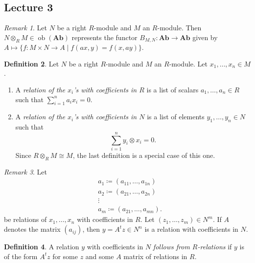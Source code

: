\documentclass[10pt,letterpaper,cm]{nupset}
\theoremstyle{definition}
\newtheorem{definition}{Definition}[subsection]
\theoremstyle{theorem}
\theoremstyle{remark}
\newtheorem{remark}[definition]{Remark}
\newcommand{\1}{\mathbf{1}}
\newcommand{\0}{\vec 0}
\DeclareMathOperator{\ob}{ob}
\begin{document}
\subsection{Lecture 3}

\begin{remark}
Let $N$ be a right $R$-module and $M$ an $R$-module. Then $N \otimes_R M \in \ob(\mathbf{Ab})$ represents the functor $B_{M, N}: \mathbf{Ab} \to \mathbf{Ab}$ given by $A \mapsto \{f:  M \times N \to A \mid f(ax, y) = f(x, ay) \}$. 
\end{remark}

\begin{definition} Let $N$ be a right $R$-module and $M$ an $R$-module. Let $x_1, \ldots, x_n \in M$.
\begin{enumerate}
\item A \textit{relation of the $x_i$'s with coefficients in $R$} is a list of scalars $a_1, \ldots, a_n \in R$ such that $\sum_{i=1}^n a_ix_i =0$.
\item A \textit{relation of the $x_i$'s with coefficients in $N$} is a list of elements $y_1, \ldots, y_n \in N$ such that $$\sum_{i=1}^n y_i \otimes x_i =0.$$ Since $R \otimes_R M \cong M$, the last definition is a special case of this one.
\end{enumerate}
\end{definition}

\begin{remark}
Let
\begin{align*}
& a_1 \coloneqq  (a_{11}, \ldots, a_{1n})
\\ & a_2 \coloneqq  (a_{21}, \ldots, a_{2n})
\\ & \vdots
\\ & a_m \coloneqq  (a_{21}, \ldots, a_{mn}).
\end{align*} be relations of $x_1, \ldots, x_n$ with coefficients in $R$.
Let $(z_1, \ldots, z_m)\in N^m$. If $A$ denotes the matrix $(a_{ij})$, then $y= A^tz \in N^n$ is a relation with coefficients in $N$.
\end{remark}

\begin{definition}
A relation $y$ with coefficients in $N$ \textit{follows from $R$-relations} if $y$ is of the form $A^tz$ for some $z$ and some $A$ matrix of relations in $R$.
\end{definition}
\end{document}
